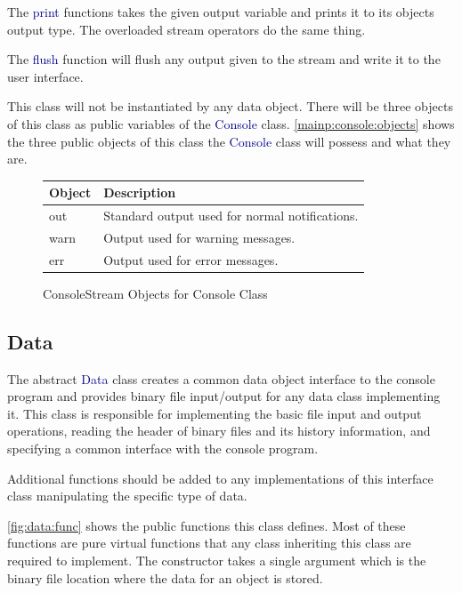 \documentclass[10pt]{article}
\providecommand{\h}[1]{\textcolor{darkblue}{#1}}
\begin{document}
The \h{print} functions takes the given output variable and prints it to its 
objects output type. The overloaded stream operators do the same thing.

The \h{flush} function will flush any output given to the stream and write it 
to the user interface.

This class will not be instantiated by any data object. There will be three 
objects of this class as public variables of the \h{Console} class. 
\autoref{mainp:console:objects} shows the three public objects of this class 
the \h{Console} class will possess and what they are.

\begin{figure}[H]
\begin{mdframed}[style=vtable]
\begin{tabularx}{\textwidth}{|l|X|}
\hline
\textbf{Object} & \textbf{Description} \\
\hline
out & Standard output used for normal notifications. \\
\hline
warn & Output used for warning messages. \\
\hline
err & Output used for error messages. \\
\hline
\end{tabularx}
\end{mdframed}
\caption{ConsoleStream Objects for Console Class}
\label{mainp:console:objects}
\end{figure}

\subsection{Data}

The abstract \h{Data} class creates a common data object interface to the 
console program and provides binary file input/output for any data class 
implementing it. This class is responsible for implementing the basic file input 
and output operations, reading the header of binary files and its history 
information, and specifying a common interface with the console program.

Additional functions should be added to any implementations of this interface 
class manipulating the specific type of data.

\autoref{fig:data:func} shows the public functions this class defines. Most of 
these functions are pure virtual functions that any class inheriting this class 
are required to implement. The constructor takes a single argument which is the 
binary file location where the data for an object is stored.
\end{document}
